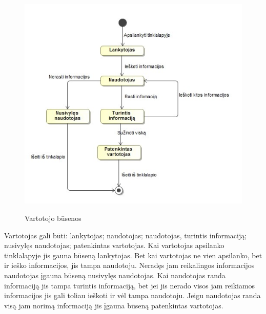 \documentclass{VUMIFPSkursinis}
\begin{document}
\begin{figure}[H]
    \centering
    \includegraphics[scale=0.7]{img/geri/Vartotojas_Busenos.jpg}
    \label{img:uml19}
	\caption{Vartotojo būsenos}
\end{figure}
Vartotojas gali būti: lankytojas; naudotojas; naudotojas, turintis informaciją; nusivylęs naudotojas; patenkintas vartotojas. Kai vartotojas apsilanko tinklalapyje jis gauna būseną lankytojas. Bet kai vartotojas ne vien apsilanko, bet ir ieško informacijos, jis tampa naudotoju. Neradęs jam reikalingos informacijos naudotojas įgauna būseną nusivylęs naudotojas. Kai naudotojas randa informaciją jis tampa turintis informaciją, bet jei jis nerado visos jam reikiamos informacijos jis gali toliau ieškoti ir vėl tampa naudotoju. Jeigu naudotojas randa visą jam norimą informaciją jis įgauna būseną patenkintas vartotojas.
\end{document}
